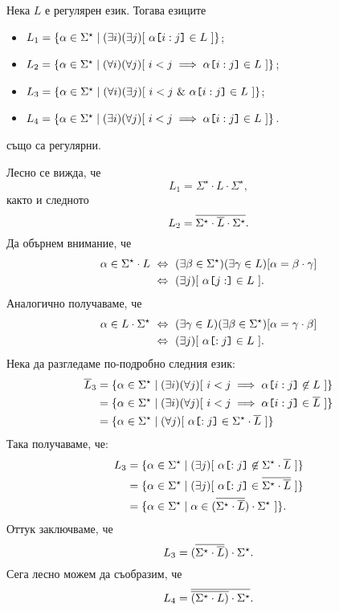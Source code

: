 \begin{extra}
\begin{problem}
  Нека $L$ е регулярен език. Тогава езиците
  \begin{itemize}
  \item
    $L_1 = \{ \alpha \in \Sigma^\star \mid (\exists i)(\exists j)[\ \alpha\texttt{[}{i:j}\texttt{]} \in L\ ]\}$;
  \item
    $L_2 = \{ \alpha \in \Sigma^\star \mid (\forall i)(\forall j)[\ i < j \implies \alpha\slice{i:j} \in L\ ]\}$;
  \item 
    $L_3 = \{ \alpha \in \Sigma^\star \mid (\forall i)(\exists j)[\ i < j\ \&\ \alpha\slice{i:j} \in L\ ]\}$;
  \item
    $L_4 = \{ \alpha \in \Sigma^\star \mid (\exists i)(\forall j)[\ i < j \implies \alpha\slice{i:j} \in L\ ]\}$.
  \end{itemize}
  също са регулярни.
\end{problem}
\begin{hint}
  Лесно се вижда, че
  \[L_1 = \Sigma^\star \cdot L \cdot \Sigma^\star,\]
  както и следното
  \[L_2 = \overline{\Sigma^\star \cdot \overline{L} \cdot \Sigma^\star}.\]
  Да обърнем внимание, че
  \begin{align*}
    \alpha \in \Sigma^\star \cdot L & \iff (\exists \beta \in \Sigma^\star)(\exists \gamma \in L)[ \alpha = \beta \cdot \gamma]\\
                                    & \iff (\exists j)[\ \alpha\slice{j:} \in L\ ].
  \end{align*}
  Аналогично получаваме, че
    \begin{align*}
      \alpha \in L\cdot \Sigma^\star & \iff (\exists \gamma \in L)(\exists \beta \in \Sigma^\star)[ \alpha = \gamma \cdot \beta ]\\
                                     & \iff (\exists j)[\ \alpha\slice{:j} \in L\ ].
  \end{align*}
  Нека да разгледаме по-подробно следния език:
  \begin{align*}
    \ov{L}_3 & = \{\alpha \in \Sigma^\star \mid (\exists i)(\forall j)[\ i < j \implies \alpha\slice{i:j} \not\in L\ ]\}\\
             & = \{\alpha \in \Sigma^\star \mid (\exists i)(\forall j)[\ i < j \implies \alpha\slice{i:j} \in \ov{L}\ ]\}\\
             & = \{\alpha \in \Sigma^\star \mid (\forall j)[\ \alpha\slice{:j} \in \Sigma^\star \cdot \ov{L}\ ]\}
  \end{align*}
  Така получаваме, че:
  \begin{align*}
    L_3 & = \{\alpha \in \Sigma^\star \mid (\exists j)[\ \alpha\slice{:j} \not\in \Sigma^\star \cdot \ov{L}\ ]\}\\
        & = \{\alpha \in \Sigma^\star \mid (\exists j)[\ \alpha\slice{:j} \in \ov{\Sigma^\star \cdot \ov{L}}\ ]\}\\
        & = \{\alpha \in \Sigma^\star \mid \alpha \in (\ov{\Sigma^\star \cdot \ov{L}}) \cdot \Sigma^\star \ ]\}.
  \end{align*}
  Оттук заключваме, че
  \[L_3 = (\overline{\Sigma^\star \cdot \overline{L}}) \cdot \Sigma^\star.\]
  Сега лесно можем да съобразим, че
  \[ L_4 = \overline{ \overline{(\Sigma^\star \cdot L)} \cdot \Sigma^\star}.\]
\end{hint}


\end{extra}
